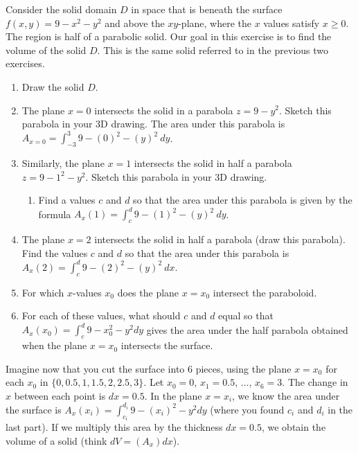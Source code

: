 \begin{challenge}%
Consider the solid domain $D$ in space that is beneath the surface $f(x,y)=9-x^2-y^2$ and above the $xy$-plane, where the $x$ values satisfy $x\geq 0$.  The region is half of a parabolic solid.  Our goal in this exercise is to find the volume of the solid $D$. This is the same solid referred to in the previous two exercises. 
\begin{enumerate}
	\item Draw the solid $D$. 
	\item The plane $x=0$ intersects the solid in a parabola $z=9-y^2$. Sketch this parabola in your 3D drawing. The area under this parabola is $A_{x=0} = \int_{-3}^3 9-(0)^2-(y)^2 \ dy$.
	\item  Similarly, the plane $x=1$ intersects the solid in half a parabola $z=9-1^2-y^2$. Sketch this parabola in your 3D drawing. 
	\begin{enumerate}
		\item Find a values $c$ and $d$ so that the area under this parabola is given by the formula $A_x(1)=\int_c^{d} 9-(1)^2-(y)^2 \ dy$.
	\end{enumerate}
	\item The plane $x=2$ intersects the solid in half a parabola (draw this parabola). Find the values $c$ and $d$ so that the area under this parabola is $A_x(2)=\int_c^d 9-(2)^2-(y)^2 \ dx$.
	\item {}
		For which $x$-values $x_0$ does the plane $x=x_0$ intersect the paraboloid. 
	\item For each of these values, what should $c$ and $d$ equal so that $A_x(x_0) = \int_c^d 9-x_0^2-y^2 dy$ gives the area under the half parabola obtained when the plane $x=x_0$ intersects the surface. 
\end{enumerate}
Imagine now that you cut the surface into 6 pieces, using the plane $x=x_0$ for each $x_0$ in $\{0,0.5,1,1.5,2, 2.5,3\}$. Let $x_0=0$, $x_1=0.5$, $\ldots$, $x_{6}=3$. The change in $x$ between each point is $dx=0.5$. In the plane $x=x_i$, we know the area under the surface is $A_x(x_i) = \int_{c_i}^{d_i} 9-(x_i)^2-y^2 dy$ (where you found $c_i$  and $d_i$ in the last part).  If we multiply this area by the thickness $dx=0.5$, we obtain the volume of a solid (think $dV=(A_x)dx$). 

\end{challenge}
